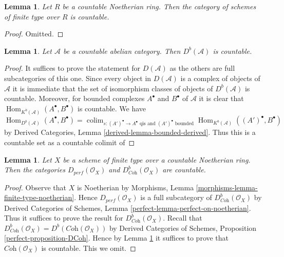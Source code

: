 \documentclass{stacks-project}
\theoremstyle{plain}
\newtheorem{lemma}[subsection]{Lemma}
\theoremstyle{definition}
\theoremstyle{remark}
\numberwithin{equation}{subsection}
\def\colim{\mathop{\mathrm{colim}}\nolimits}
\def\Hom{\mathop{\mathrm{Hom}}\nolimits}
\begin{document}
\begin{lemma}
\label{lemma-countable-finite-type}
Let $R$ be a countable Noetherian ring. Then the category of schemes of finite
type over $R$ is countable.
\end{lemma}

\begin{proof}
Omitted.
\end{proof}

\begin{lemma}
\label{lemma-countable-abelian}
Let $\mathcal{A}$ be a countable abelian category.
Then $D^b(\mathcal{A})$ is countable.
\end{lemma}

\begin{proof}
It suffices to prove the statement for $D(\mathcal{A})$ as the others
are full subcategories of this one. Since every object in $D(\mathcal{A})$
is a complex of objects of $\mathcal{A}$ it is immediate that the set of
isomorphism classes of objects of $D^b(\mathcal{A})$ is countable.
Moreover, for bounded complexes $A^\bullet$ and $B^\bullet$ of $\mathcal{A}$
it is clear that $\Hom_{K^b(\mathcal{A})}(A^\bullet, B^\bullet)$ is countable.
We have
$$
\Hom_{D^b(\mathcal{A})}(A^\bullet, B^\bullet) =
\colim_{s : (A')^\bullet \to A^\bullet
\text{ qis and }(A')^\bullet\text{ bounded}}
\Hom_{K^b(\mathcal{A})}((A')^\bullet, B^\bullet)
$$
by Derived Categories, Lemma \ref{derived-lemma-bounded-derived}.
Thus this is a countable set as a countable colimit of
\end{proof}

\begin{lemma}
\label{lemma-countable-perfect}
Let $X$ be a scheme of finite type over a countable Noetherian ring.
Then the categories $D_{perf}(\mathcal{O}_X)$ and
$D^b_{\textit{Coh}}(\mathcal{O}_X)$ are countable.
\end{lemma}

\begin{proof}
Observe that $X$ is Noetherian by
Morphisms, Lemma \ref{morphisms-lemma-finite-type-noetherian}.
Hence $D_{perf}(\mathcal{O}_X)$ is a full subcategory of
$D^b_{\textit{Coh}}(\mathcal{O}_X)$ by
Derived Categories of Schemes, Lemma \ref{perfect-lemma-perfect-on-noetherian}.
Thus it suffices to prove
the result for $D^b_{\textit{Coh}}(\mathcal{O}_X)$.
Recall that
$D^b_{\textit{Coh}}(\mathcal{O}_X) = D^b(\textit{Coh}(\mathcal{O}_X))$
by
Derived Categories of Schemes, Proposition \ref{perfect-proposition-DCoh}.
Hence by Lemma \ref{lemma-countable-abelian}
it suffices to prove that $\textit{Coh}(\mathcal{O}_X)$ is
countable. This we omit.
\end{proof}
\end{document}

